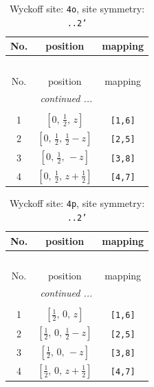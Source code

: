 \documentclass[fleqn,8pt]{jsarticle}
\begin{document}
\renewcommand{\arraystretch}{1.2}
\begin{longtable}{ccc}
\caption{Wyckoff site: {\tt 4o}, site symmetry: {\tt ..2'}}
 \\
 \hline \hline
No. & position & mapping \\ \hline \endfirsthead

\multicolumn{2}{l}{\tablename\ \thetable{}} \\
 \hline \hline
No. & position & mapping \\ \hline \endhead

 \hline \hline
\multicolumn{2}{r}{\footnotesize\it continued ...} \\ \endfoot

 \hline \hline
\multicolumn{2}{r}{} \\ \endlastfoot

1 & $\left[ 0,\, \frac{1}{2},\, z \right]$ & {\tt [1,6]} \\ \hline
2 & $\left[ 0,\, \frac{1}{2},\, \frac{1}{2} - z \right]$ & {\tt [2,5]} \\ \hline
3 & $\left[ 0,\, \frac{1}{2},\, - z \right]$ & {\tt [3,8]} \\ \hline
4 & $\left[ 0,\, \frac{1}{2},\, z + \frac{1}{2} \right]$ & {\tt [4,7]} \\
\end{longtable}
\renewcommand{\arraystretch}{1.2}
\begin{longtable}{ccc}
\caption{Wyckoff site: {\tt 4p}, site symmetry: {\tt ..2'}}
 \\
 \hline \hline
No. & position & mapping \\ \hline \endfirsthead

\multicolumn{2}{l}{\tablename\ \thetable{}} \\
 \hline \hline
No. & position & mapping \\ \hline \endhead

 \hline \hline
\multicolumn{2}{r}{\footnotesize\it continued ...} \\ \endfoot

 \hline \hline
\multicolumn{2}{r}{} \\ \endlastfoot

1 & $\left[ \frac{1}{2},\, 0,\, z \right]$ & {\tt [1,6]} \\ \hline
2 & $\left[ \frac{1}{2},\, 0,\, \frac{1}{2} - z \right]$ & {\tt [2,5]} \\ \hline
3 & $\left[ \frac{1}{2},\, 0,\, - z \right]$ & {\tt [3,8]} \\ \hline
4 & $\left[ \frac{1}{2},\, 0,\, z + \frac{1}{2} \right]$ & {\tt [4,7]} \\
\end{longtable}
\end{document}
